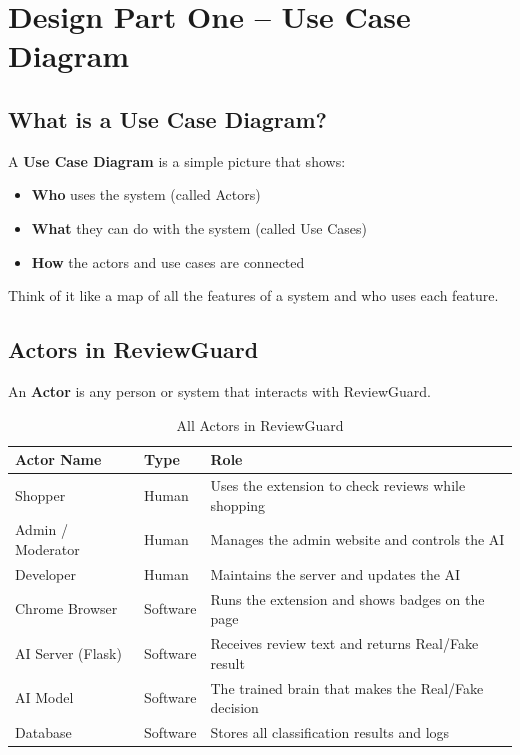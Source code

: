 \documentclass[10pt, a4paper]{report}
\begin{document}
\chapter{Design Part One -- Use Case Diagram}

\section{What is a Use Case Diagram?}

A \textbf{Use Case Diagram} is a simple picture that shows:
\begin{itemize}
  \item \textbf{Who} uses the system (called Actors)
  \item \textbf{What} they can do with the system (called Use Cases)
  \item \textbf{How} the actors and use cases are connected
\end{itemize}

Think of it like a map of all the features of a system and who uses each feature.

\section{Actors in ReviewGuard}

An \textbf{Actor} is any person or system that interacts with ReviewGuard.

\begin{table}[H]
\centering
\caption{All Actors in ReviewGuard}
\begin{tabular}{lll}
\toprule
\textbf{Actor Name} & \textbf{Type} & \textbf{Role} \\
\midrule
Shopper & Human & Uses the extension to check reviews while shopping \\
Admin / Moderator & Human & Manages the admin website and controls the AI \\
Developer & Human & Maintains the server and updates the AI \\
Chrome Browser & Software & Runs the extension and shows badges on the page \\
AI Server (Flask) & Software & Receives review text and returns Real/Fake result \\
AI Model & Software & The trained brain that makes the Real/Fake decision \\
Database & Software & Stores all classification results and logs \\
\bottomrule
\end{tabular}
\end{table}
\end{document}
